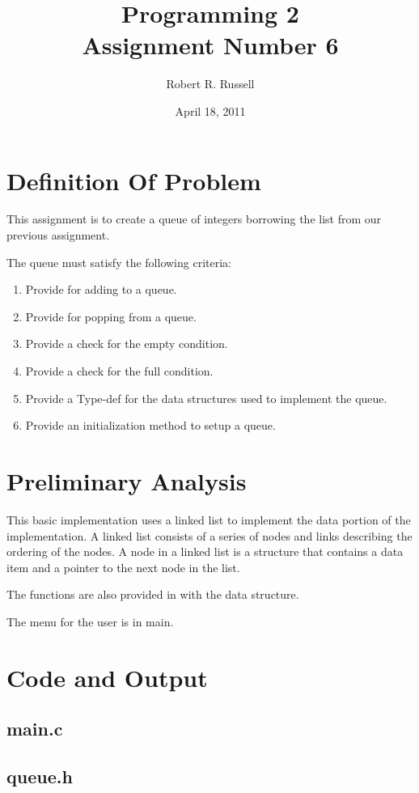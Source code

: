 \documentclass[letterpaper,oneside]{scrartcl}
\title{Programming 2\\Assignment Number 6}
\author{Robert R. Russell}
\date{April 18, 2011}
\begin{document}
\maketitle

\section{Definition Of Problem}
This assignment is to create a queue of integers borrowing the list from our
previous assignment.

The queue must satisfy the following criteria:
\begin{enumerate}
\item Provide for adding to a queue.
\item Provide for popping from a queue.
\item Provide a check for the empty condition.
\item Provide a check for the full condition.
\item Provide a Type-def for the data structures used to implement the queue.
\item Provide an initialization method to setup a queue.
\end{enumerate}

\section{Preliminary Analysis}

This basic implementation uses a linked list to implement the data portion of the implementation.
A linked list consists of a series of nodes and links describing the ordering of the nodes.
A node in a linked list is a structure that contains a data item and a pointer to the next node in the list.

The functions are also provided in with the data structure.

The menu for the user is in main.

\section{Code and Output}

\subsection{main.c}

\subsection{queue.h}
\end{document}
